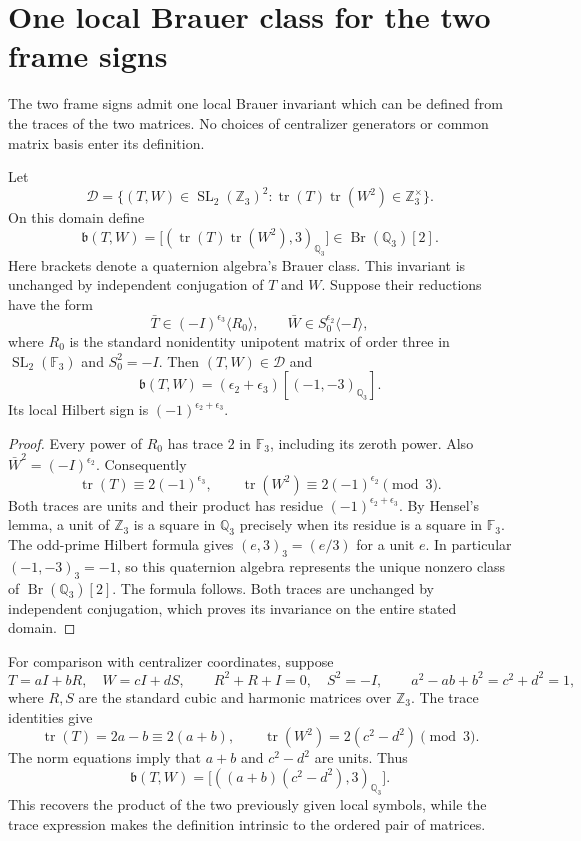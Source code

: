 

\section{One local Brauer class for the two frame signs}
The two frame signs admit one local Brauer invariant which can be defined
from the traces of the two matrices. No choices of centralizer generators
or common matrix basis enter its definition.

\begin{proposition}\label{prop:local-brauer-frame}
Let
\[
 \mathcal D=\{(T,W)\in\operatorname{SL}_2(\mathbb Z_3)^2:
       \operatorname{tr}(T)\operatorname{tr}(W^2)\in\mathbb Z_3^\times\}.
\]
On this domain define
\[
 \mathfrak b(T,W)=
 \big[(\operatorname{tr}(T)\operatorname{tr}(W^2),3)_{\mathbb Q_3}\big]
       \in\operatorname{Br}(\mathbb Q_3)[2].
\]
Here brackets denote a quaternion algebra's Brauer class.
This invariant is unchanged by independent conjugation of $T$ and $W$.
Suppose their reductions have the form
\[
 \bar T\in(-I)^{\epsilon_3}\langle R_0\rangle,
 \qquad \bar W\in S_0^{\epsilon_2}\langle-I\rangle,
\]
where $R_0$ is the standard nonidentity unipotent matrix of order three
in $\operatorname{SL}_2(\mathbb F_3)$ and $S_0^2=-I$.
Then $(T,W)\in\mathcal D$ and
\[
 \mathfrak b(T,W)=(\epsilon_2+\epsilon_3)
                 [(-1,-3)_{\mathbb Q_3}].
\]
Its local Hilbert sign is $(-1)^{\epsilon_2+\epsilon_3}$.
\end{proposition}
\begin{proof}
Every power of $R_0$ has trace $2$ in $\mathbb F_3$, including its
zeroth power. Also $\bar W^2=(-I)^{\epsilon_2}$. Consequently
\[
 \operatorname{tr}(T)\equiv2(-1)^{\epsilon_3},\qquad
 \operatorname{tr}(W^2)\equiv2(-1)^{\epsilon_2}\pmod3.
\]
Both traces are units and their product has residue
$(-1)^{\epsilon_2+\epsilon_3}$. By Hensel's lemma, a unit of
$\mathbb Z_3$ is a square in $\mathbb Q_3$ precisely when its residue
is a square in $\mathbb F_3$. The odd-prime Hilbert formula gives
$(e,3)_3=(e/3)$ for a unit $e$. In particular $(-1,-3)_3=-1$,
so this quaternion algebra represents the unique nonzero class of
$\operatorname{Br}(\mathbb Q_3)[2]$. The formula follows.
Both traces are unchanged by independent conjugation, which proves
its invariance on the entire stated domain.
\end{proof}

For comparison with centralizer coordinates, suppose
\[
 T=aI+bR,\quad W=cI+dS,\qquad
 R^2+R+I=0,\quad S^2=-I,
 \qquad a^2-ab+b^2=c^2+d^2=1,
\]
where $R,S$ are the standard cubic and harmonic matrices over $\mathbb Z_3$.
The trace identities give
\[
 \operatorname{tr}(T)=2a-b\equiv2(a+b),\qquad
 \operatorname{tr}(W^2)=2(c^2-d^2)\pmod3.
\]
The norm equations imply that $a+b$ and $c^2-d^2$ are units. Thus
\[
 \mathfrak b(T,W)=\big[((a+b)(c^2-d^2),3)_{\mathbb Q_3}\big].
\]
This recovers the product of the two previously given local symbols,
while the trace expression makes the definition intrinsic to the ordered
pair of matrices.

